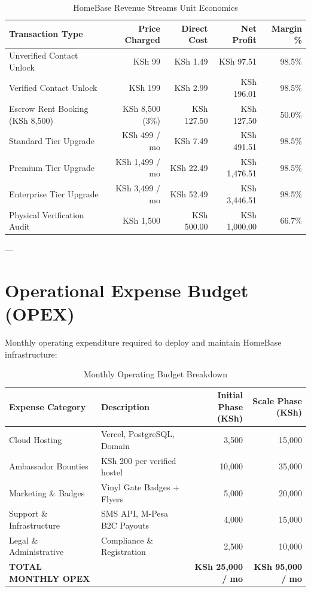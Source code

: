 \documentclass[11pt,a4paper]{article}
\begin{document}
\begin{table}[h]
\centering
\begin{tabularx}{\textwidth}{X r r r r}
\toprule
\textbf{Transaction Type} & \textbf{Price Charged} & \textbf{Direct Cost} & \textbf{Net Profit} & \textbf{Margin \%} \\
\midrule
Unverified Contact Unlock & KSh 99 & KSh 1.49 & KSh 97.51 & 98.5\% \\
Verified Contact Unlock & KSh 199 & KSh 2.99 & KSh 196.01 & 98.5\% \\
Escrow Rent Booking (KSh 8,500) & KSh 8,500 (3\%) & KSh 127.50 & KSh 127.50 & 50.0\% \\
Standard Tier Upgrade & KSh 499 / mo & KSh 7.49 & KSh 491.51 & 98.5\% \\
Premium Tier Upgrade & KSh 1,499 / mo & KSh 22.49 & KSh 1,476.51 & 98.5\% \\
Enterprise Tier Upgrade & KSh 3,499 / mo & KSh 52.49 & KSh 3,446.51 & 98.5\% \\
Physical Verification Audit & KSh 1,500 & KSh 500.00 & KSh 1,000.00 & 66.7\% \\
\bottomrule
\end{tabularx}
\caption{HomeBase Revenue Streams Unit Economics}
\end{table}

---

\section{Operational Expense Budget (OPEX)}

Monthly operating expenditure required to deploy and maintain HomeBase infrastructure:

\begin{table}[h]
\centering
\begin{tabularx}{\textwidth}{X X r r}
\toprule
\textbf{Expense Category} & \textbf{Description} & \textbf{Initial Phase (KSh)} & \textbf{Scale Phase (KSh)} \\
\midrule
Cloud Hosting & Vercel, PostgreSQL, Domain & 3,500 & 15,000 \\
Ambassador Bounties & KSh 200 per verified hostel & 10,000 & 35,000 \\
Marketing \& Badges & Vinyl Gate Badges + Flyers & 5,000 & 20,000 \\
Support \& Infrastructure & SMS API, M-Pesa B2C Payouts & 4,000 & 15,000 \\
Legal \& Administrative & Compliance \& Registration & 2,500 & 10,000 \\
\midrule
\textbf{TOTAL MONTHLY OPEX} & & \textbf{KSh 25,000 / mo} & \textbf{KSh 95,000 / mo} \\
\bottomrule
\end{tabularx}
\caption{Monthly Operating Budget Breakdown}
\end{table}
\end{document}
